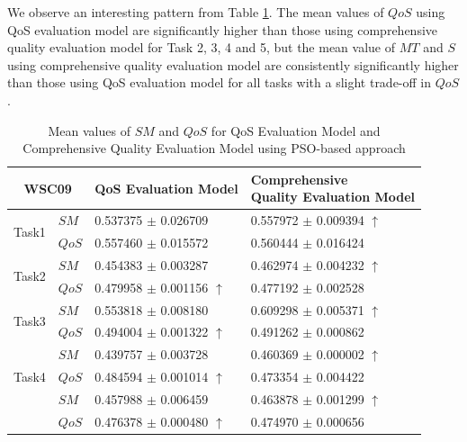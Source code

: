 \documentclass{llncs}
\begin{document}
We observe an interesting pattern from Table \ref{decisionTable}. The mean values of $QoS$ using QoS evaluation model are significantly higher than those using comprehensive quality evaluation model for Task 2, 3, 4 and 5,  but the mean value of $MT$ and $S$ using comprehensive quality evaluation model are consistently significantly higher than those using QoS evaluation model for all tasks with a slight trade-off in $QoS$.

\begin{table}[]
\footnotesize
\centering
\caption{Mean values of $SM$ and $QoS$ for QoS Evaluation Model and Comprehensive Quality Evaluation Model using PSO-based approach}
\label{decisionTable}
\begin{tabular}{l|l|l|l}
\hline
\multicolumn{2}{c|}{WSC09}              & QoS Evaluation Model         &\shortstack{Comprehensive \\ Quality Evaluation Model} \\ \hline
\multirow{2}{*}{Task1}  &$SM$   &0.537375 $\pm$ 0.026709               &0.557972 $\pm$ 0.009394 $\uparrow$ \\ \cline{2-4}
                        &$QoS$  &0.557460 $\pm$ 0.015572               &0.560444 $\pm$ 0.016424                          \\ \hline
\multirow{2}{*}{Task2}  &$SM$   &0.454383 $\pm$ 0.003287               &0.462974 $\pm$ 0.004232 $\uparrow$ \\ \cline{2-4} 
                        &$QoS$  &0.479958 $\pm$ 0.001156 $\uparrow$    &0.477192 $\pm$ 0.002528 \\ \hline
\multirow{2}{*}{Task3}  &$SM$   &0.553818 $\pm$ 0.008180               &0.609298 $\pm$ 0.005371 $\uparrow$   \\ \cline{2-4} 
                        &$QoS$  &0.494004 $\pm$ 0.001322 $\uparrow$    &0.491262 $\pm$ 0.000862            \\ \hline
\multirow{3}{*}{Task4}  &$SM$   &0.439757 $\pm$ 0.003728               &0.460369 $\pm$ 0.000002 $\uparrow$ \\ \cline{2-4} 
                        &$QoS$  &0.484594 $\pm$ 0.001014 $\uparrow$    &0.473354 $\pm$ 0.004422  \\ \hline
\multirow{3}{*}{Task5}  &$SM$   &0.457988 $\pm$ 0.006459               &0.463878 $\pm$ 0.001299 $\uparrow$           \\ \cline{2-4} 
                        &$QoS$  &0.476378 $\pm$ 0.000480 $\uparrow$    &0.474970 $\pm$ 0.000656  \\ \hline                                                   
\end{tabular}
\end{table}
\end{document}
